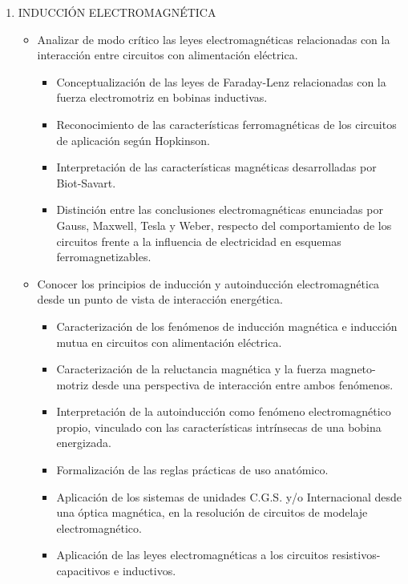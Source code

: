 \documentclass[../main]{subfiles}
\begin{document}
\begin{enumerate}
\begin{itemize}
        \item Interpretar las teorías electrodinámicas eléctricas en una máquina rotativa.
    \end{itemize}
    \item INDUCCIÓN ELECTROMAGNÉTICA 
    \begin{itemize}
        \item Analizar de modo crítico las 
leyes electromagnéticas 
relacionadas con la interacción entre circuitos 
con alimentación eléctrica. 
    \begin{itemize}
        \item Conceptualización de las leyes de Faraday-Lenz 
relacionadas con la fuerza electromotriz en bobinas inductivas. 
        \item Reconocimiento de las características ferromagnéticas de 
los circuitos de aplicación según Hopkinson. 
\item Interpretación de las características magnéticas 
desarrolladas por Biot-Savart. 
\item Distinción entre las conclusiones electromagnéticas 
enunciadas por Gauss, Maxwell, Tesla y Weber, respecto 
del comportamiento de los circuitos frente a la influencia 
de electricidad en esquemas ferromagnetizables. 
    \end{itemize}
        \item Conocer los principios de 
inducción y autoinducción 
electromagnética desde un 
punto de vista de 
interacción energética. 
\begin{itemize}
    \item Caracterización de los fenómenos de inducción 
magnética e inducción mutua en circuitos con 
alimentación eléctrica. 
\item Caracterización de la reluctancia magnética y la fuerza 
magneto-motriz desde una perspectiva de interacción
entre ambos fenómenos. 
\item Interpretación de la autoinducción como fenómeno 
electromagnético propio, vinculado con las características 
intrínsecas de una bobina energizada. 
\item Formalización de las reglas prácticas de uso anatómico. 
\item Aplicación de los sistemas de unidades C.G.S. y/o
Internacional desde una óptica magnética, en la 
resolución de circuitos de modelaje electromagnético. 
\item Aplicación de las leyes electromagnéticas a los circuitos 
resistivos-capacitivos e inductivos. 
\end{itemize}
    

\end{itemize}
\end{enumerate}
\end{document}
